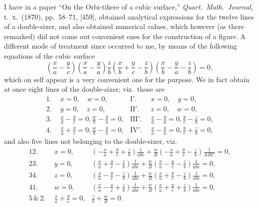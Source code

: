 \documentclass[11pt,a4paper]{article}
\theoremstyle{plain}
\theoremstyle{definition}
\begin{document}
I have in a paper ``On the Orbi-tikere of a cubic surface,'' \textit{Quart.\ Math.\ Journal},
t.~\textsc{x}.~(1870), pp.~58--71, [459], obtained analytical expressions for the twelve lines of
a double-sixer, and also obtained numerical values, which however (as there remarked)
did not come out convenient enes for the construction of a figure.  A different mode
of treatment since occurred to me, by means of the following equations of the cubic
surface
\[
\left(\frac{x}{a} - \frac{y}{c}\right)\left(\frac{x}{a} - \frac{y}{a}\right)\frac{z}{b}\left(\frac{x}{b} + \frac{y}{c} - \frac{z}{b}\right)\left(\frac{x}{b} - \frac{y}{a} - \frac{z}{b}\right) = 0,
\]
which on self appear is a very convenient one for the purpose.  We in fact obtain at
once eight lines of the double-sixer; viz.\ those are
\begin{align*}
1.\ \ & x = 0,\quad w = 0, & \mathrm{I'}.\ \ & x = 0,\quad y = 0, \\
2.\ \ & y = 0,\quad z = 0, & \mathrm{II'}.\ \ & z = 0,\quad w = 0, \\
3.\ \ & \tfrac{x}{a} - \tfrac{y}{c} = 0, \tfrac{w}{b} - \tfrac{y}{a} = 0, & \mathrm{III'}.\ \ & \tfrac{x}{a} - \tfrac{y}{a} = 0, \tfrac{y}{c} - \tfrac{z}{b} = 0, \\
4.\ \ & \tfrac{x}{a} + \tfrac{y}{c} = 0, \tfrac{w}{b} - \tfrac{y}{a} = 0, & \mathrm{IV'}.\ \ & \tfrac{x}{a} - \tfrac{y}{a} = 0, \tfrac{y}{c} + \tfrac{z}{b} = 0,
\end{align*}
and also five lines not belonging to the double-sixer, viz.\
\begin{align*}
12.\ \ & x = 0, & \left(-\tfrac{x}{a} + \tfrac{y}{c} + \tfrac{z}{b}\right)\tfrac{1}{abc} + \tfrac{w}{B}\left(-\tfrac{x}{a} + \tfrac{y}{c} - \tfrac{z}{b}\right)\tfrac{1}{ABC} = 0, \\
23.\ \ & y = 0, & \left(\tfrac{x}{a} + \tfrac{y}{c} - \tfrac{z}{b}\right)\tfrac{1}{abc} + \tfrac{w}{B}\left(\tfrac{x}{a} - \tfrac{y}{c} - \tfrac{z}{b}\right)\tfrac{1}{abc} = 0, \\
34.\ \ & z = 0, & \left(\tfrac{x}{a} - \tfrac{y}{c} - \tfrac{z}{b}\right)\tfrac{1}{abc} + \tfrac{w}{B}\left(\tfrac{x}{a} + \tfrac{y}{c} - \tfrac{z}{b}\right)\tfrac{1}{abc} = 0, \\
41.\ \ & w = 0, & \left(\tfrac{x}{a} - \tfrac{y}{c} + \tfrac{z}{b}\right)\tfrac{1}{abc} + \tfrac{w}{B}\left(\tfrac{x}{a} + \tfrac{y}{c} + \tfrac{z}{b}\right)\tfrac{1}{abc} = 0, \\
5\,\&\,2.\ \ & \tfrac{x}{a} + \tfrac{y}{c} = 0, & \tfrac{z}{b} + \tfrac{w}{B} = 0.
\end{align*}
\end{document}
